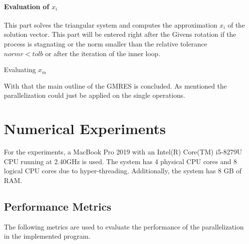 \documentclass{article}
\begin{document}
\paragraph{Evaluation of $x_i$}
This part solves the triangular system and computes the approximation $x_i$ of the solution vector. This part will be entered right after the Givens rotation if the process is stagnating or the norm smaller than the relative tolerance $normr < tolb$ or after the iteration of the inner loop.\\
\begin{algorithm}[h]
\LinesNumbered
\SetAlgoLined
{}

\caption{Evaluating $x_m$}\label{alg:gmres-eval}
\end{algorithm}

With that the main outline of the GMRES is concluded. As mentioned the parallelization could just be applied on the single operations.
\section{Numerical Experiments}
For the experiments, a MacBook Pro 2019 with an Intel(R) Core(TM) i5-8279U CPU running at 2.40GHz is used. The system has 4 physical CPU cores and 8 logical CPU cores due to hyper-threading. Additionally, the system has 8 GB of RAM.
\subsection{Performance Metrics}
The following metrics are used to evaluate the performance of the parallelization in the implemented program.
\end{document}
